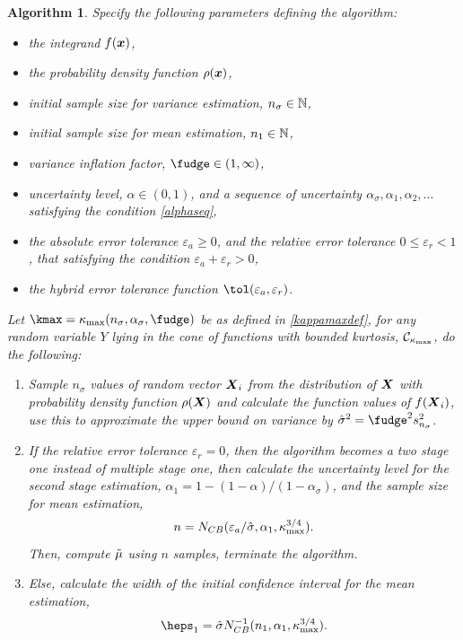 \documentclass{iitthesis}
\newtheorem{algorithm}[theorem]{Algorithm}
\begin{document}
\begin{algorithm}\label{meanMCg} 
Specify the following parameters defining the algorithm:
\begin{itemize}
\item the integrand $f(\boldsymbol{x})$,
\item the probability density function $\rho(\boldsymbol{x})$,
\item initial sample size for variance estimation, $n_{\sigma} \in \mathbb{N}$,
\item initial sample size for mean estimation, $n_1 \in \mathbb{N}$,
\item variance inflation factor, $\fudge \in (1,\infty)$, 
\item uncertainty level, $\alpha\in (0,1)$, and a sequence of uncertainty $ \alpha_\sigma, \alpha_1,  \alpha_2, \ldots$ satisfying the condition \eqref{alphaseq}, 
\item the absolute error tolerance $\varepsilon_a \geq 0$, and the relative error tolerance $0 \leq \varepsilon_r <1$, that satisfying the condition $\varepsilon_a+\varepsilon_r >0$,
\item the hybrid error tolerance function $\tol(\varepsilon_a,\varepsilon_r)$.
\end{itemize} 
Let $\kmax=\kappa_{\max}(n_\sigma,\alpha_\sigma,\fudge)$ be as defined in \eqref{kappamaxdef}, for any random variable $Y$ lying in the cone of functions with bounded kurtosis, $\mathcal{C}_{\kappa_{\max}}$, do the following:
\begin{enumerate}
\item Sample $n_\sigma$ values of random vector $\boldsymbol{X}_i$ from the distribution of $\boldsymbol{X}$ with probability density function $\rho(\boldsymbol{X})$ and calculate the function values of $f(\boldsymbol{X}_i)$, use this to approximate the upper bound on variance by $\hsigma^2 = \fudge^2 s^2_{n_\sigma}$. 
\item If the relative error tolerance $\varepsilon_r=0$, then the algorithm becomes a two stage one instead of multiple stage one, then calculate the uncertainty level for the second stage estimation, $\alpha_1 = 1-(1-\alpha)/(1-\alpha_\sigma)$, and the sample size for mean estimation,
$$n = N_{CB}(\varepsilon_a/\hat{\sigma},\alpha_1,\kappa_{\max}^{3/4}).$$ Then, compute $\tilde{\mu}$ using $n$ samples, terminate the algorithm.
\item Else, calculate the width of the initial confidence interval for the mean estimation,
\begin{align}\label{eps1def}
\heps_1=\hsigma N_{CB}^{-1}(n_1,\alpha_1,\kappa_{\max}^{3/4}).

\end{align}
\end{enumerate}
\end{algorithm}
\end{document}
